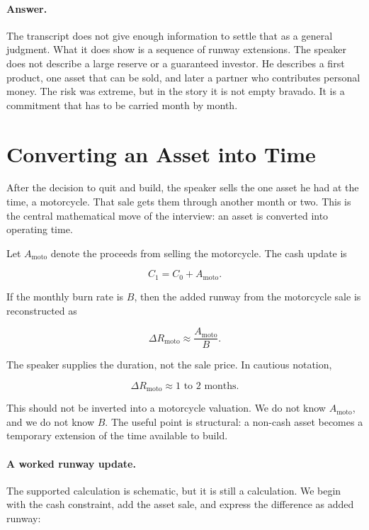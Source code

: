 \paragraph{Answer.}
The transcript does not give enough information to settle that as a general judgment. What it does show is a sequence of runway extensions. The speaker does not describe a large reserve or a guaranteed investor. He describes a first product, one asset that can be sold, and later a partner who contributes personal money. The risk was extreme, but in the story it is not empty bravado. It is a commitment that has to be carried month by month.

\section{Converting an Asset into Time}

After the decision to quit and build, the speaker sells the one asset he had at the time, a motorcycle. That sale gets them through another month or two. This is the central mathematical move of the interview: an asset is converted into operating time.

Let \(A_{\mathrm{moto}}\) denote the proceeds from selling the motorcycle. The cash update is

\begin{equation}
C_1 = C_0 + A_{\mathrm{moto}} .
\end{equation}

If the monthly burn rate is \(B\), then the added runway from the motorcycle sale is reconstructed as

\begin{equation}
\Delta R_{\mathrm{moto}} \approx \frac{A_{\mathrm{moto}}}{B}.
\end{equation}

The speaker supplies the duration, not the sale price. In cautious notation,

\begin{equation}
\Delta R_{\mathrm{moto}} \approx 1\text{ to }2 \text{ months}.
\end{equation}

This should not be inverted into a motorcycle valuation. We do not know \(A_{\mathrm{moto}}\), and we do not know \(B\). The useful point is structural: a non-cash asset becomes a temporary extension of the time available to build.

\paragraph{A worked runway update.}
The supported calculation is schematic, but it is still a calculation. We begin with the cash constraint, add the asset sale, and express the difference as added runway:

